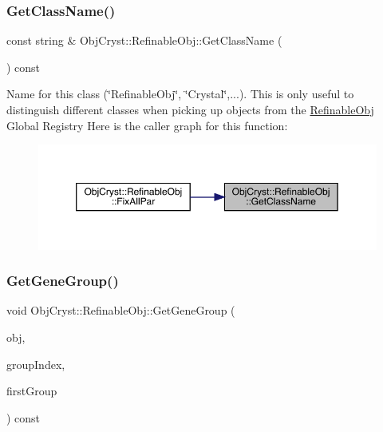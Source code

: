 \subsubsection{\texorpdfstring{GetClassName()}{GetClassName()}}
{\footnotesize\ttfamily const string \& Obj\+Cryst\+::\+Refinable\+Obj\+::\+Get\+Class\+Name (\begin{DoxyParamCaption}{ }\end{DoxyParamCaption}) const\hspace{0.3cm}{\ttfamily [virtual]}}

Name for this class (\char`\"{}\+Refinable\+Obj\char`\"{}, \char`\"{}\+Crystal\char`\"{},...). This is only useful to distinguish different classes when picking up objects from the \mbox{\hyperlink{class_obj_cryst_1_1_refinable_obj}{Refinable\+Obj}} Global Registry Here is the caller graph for this function\+:
\nopagebreak
\begin{figure}[H]
\begin{center}
\leavevmode
\includegraphics[width=350pt]{class_obj_cryst_1_1_refinable_obj_a0803a4bd89142dc93c79ed3329bb6e1d_icgraph}
\end{center}
\end{figure}
\mbox{\label{class_obj_cryst_1_1_refinable_obj_ace4e00bd7787b2f490a1e4bfe85dbe89}} 
\subsubsection{\texorpdfstring{GetGeneGroup()}{GetGeneGroup()}}
{\footnotesize\ttfamily void Obj\+Cryst\+::\+Refinable\+Obj\+::\+Get\+Gene\+Group (\begin{DoxyParamCaption}\item[{const \mbox{\hyperlink{class_obj_cryst_1_1_refinable_obj}{Refinable\+Obj}} \&}]{obj,  }\item[{Cryst\+Vector\+\_\+uint \&}]{group\+Index,  }\item[{unsigned int \&}]{first\+Group }\end{DoxyParamCaption}) const\hspace{0.3cm}{\ttfamily [virtual]}}



